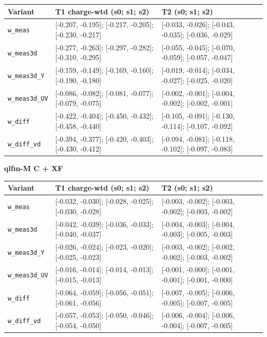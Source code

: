 \documentclass[10pt,a4paper]{article}
\begin{document}
\begin{center}\small
\setlength{\tabcolsep}{3pt}\renewcommand{\arraystretch}{1.15}
\begin{tabularx}{\linewidth}{LLL}
\toprule
\textbf{Variant} & \textbf{T1 charge-wtd (s0; s1; s2)} & \textbf{T2 (s0; s1; s2)} \\
\midrule
\texttt{w\_\allowbreak{}meas} & [-0.207, -0.195]; [-0.217, -0.205]; [-0.230, -0.217] & [-0.033, -0.026]; [-0.043, -0.035]; [-0.036, -0.029] \\
\texttt{w\_\allowbreak{}meas3d} & [-0.277, -0.263]; [-0.297, -0.282]; [-0.310, -0.295] & [-0.055, -0.045]; [-0.070, -0.059]; [-0.057, -0.047] \\
\texttt{w\_\allowbreak{}meas3d\_\allowbreak{}Y} & [-0.159, -0.149]; [-0.169, -0.160]; [-0.190, -0.180] & [-0.019, -0.014]; [-0.034, -0.027]; [-0.025, -0.020] \\
\texttt{w\_\allowbreak{}meas3d\_\allowbreak{}UV} & [-0.086, -0.082]; [-0.081, -0.077]; [-0.079, -0.075] & [-0.002, -0.001]; [-0.004, -0.002]; [-0.002, -0.001] \\
\texttt{w\_\allowbreak{}diff} & [-0.422, -0.404]; [-0.450, -0.432]; [-0.458, -0.440] & [-0.105, -0.091]; [-0.130, -0.114]; [-0.107, -0.092] \\
\texttt{w\_\allowbreak{}diff\_\allowbreak{}vd} & [-0.394, -0.377]; [-0.420, -0.403]; [-0.430, -0.412] & [-0.094, -0.081]; [-0.118, -0.102]; [-0.097, -0.083] \\
\bottomrule
\end{tabularx}
\end{center}
\textbf{qlfm-M C + XF}

\begin{center}\small
\setlength{\tabcolsep}{3pt}\renewcommand{\arraystretch}{1.15}
\begin{tabularx}{\linewidth}{LLL}
\toprule
\textbf{Variant} & \textbf{T1 charge-wtd (s0; s1; s2)} & \textbf{T2 (s0; s1; s2)} \\
\midrule
\texttt{w\_\allowbreak{}meas} & [-0.032, -0.030]; [-0.028, -0.025]; [-0.030, -0.028] & [-0.003, -0.002]; [-0.003, -0.002]; [-0.003, -0.002] \\
\texttt{w\_\allowbreak{}meas3d} & [-0.042, -0.039]; [-0.036, -0.033]; [-0.040, -0.037] & [-0.004, -0.003]; [-0.004, -0.003]; [-0.005, -0.003] \\
\texttt{w\_\allowbreak{}meas3d\_\allowbreak{}Y} & [-0.026, -0.024]; [-0.023, -0.020]; [-0.025, -0.023] & [-0.003, -0.002]; [-0.002, -0.002]; [-0.003, -0.002] \\
\texttt{w\_\allowbreak{}meas3d\_\allowbreak{}UV} & [-0.016, -0.014]; [-0.014, -0.013]; [-0.015, -0.013] & [-0.001, -0.000]; [-0.001, -0.001]; [-0.001, -0.000] \\
\texttt{w\_\allowbreak{}diff} & [-0.064, -0.059]; [-0.056, -0.051]; [-0.061, -0.056] & [-0.007, -0.005]; [-0.006, -0.005]; [-0.007, -0.005] \\
\texttt{w\_\allowbreak{}diff\_\allowbreak{}vd} & [-0.057, -0.053]; [-0.050, -0.046]; [-0.054, -0.050] & [-0.006, -0.004]; [-0.006, -0.004]; [-0.007, -0.005] \\
\bottomrule
\end{tabularx}
\end{center}
\end{document}
